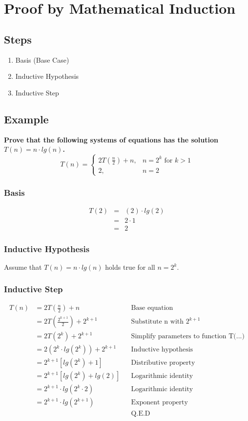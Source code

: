 \section{Proof by Mathematical Induction}

\subsection*{Steps}
\begin{enumerate}
	\item Basis (Base Case)
	\item Inductive Hypothesis
	\item Inductive Step
\end{enumerate}

\subsection{Example}
\textbf{Prove that the following systems of equations has the solution $T(n) = n \cdot lg(n)$.}
$$
T(n) = \begin{cases}
	2T(\frac{n}{2}) + n, & n = 2^k \mbox{ for } k > 1\\
	2, & n = 2
\end{cases}
$$

\subsubsection*{Basis}
\begin{eqnarray*}
T(2) &=& (2) \cdot lg(2)\\
	&=& 2 \cdot 1\\
	&=& 2
\end{eqnarray*}

\subsubsection*{Inductive Hypothesis}
Assume that $T(n) = n \cdot lg(n)$ holds true for all $n = 2^k$.

\subsubsection*{Inductive Step}
\begin{align*}
T(n)	&=	2T(\frac{n}{2}) + n						&& \text{Base equation}\\
		&= 	2T(\frac{2^{k+1}}{2}) + 2^{k+1}			&& \text{Substitute n with } 2^{k+1}\\
		&= 	2T(2^{k}) + 2^{k+1}						&& \text{Simplify parameters to function T(...)}\\
		&=	2(2^k \cdot lg(2^k)) + 2^{k+1}			&& \text{Inductive hypothesis}\\
		&=	2^{k+1} \left[ lg(2^k) + 1 \right]		&& \text{Distributive property}\\
		&=  2^{k+1} \left[ lg(2^k) + lg(2) \right]  && \text{Logarithmic identity}\\
		&= 	2^{k+1} \cdot lg(2^k \cdot 2)			&& \text{Logarithmic identity}\\
		&=  2^{k+1} \cdot lg(2^{k+1})				&& \text{Exponent property}\\
		&											&& \text{Q.E.D}
\end{align*}

